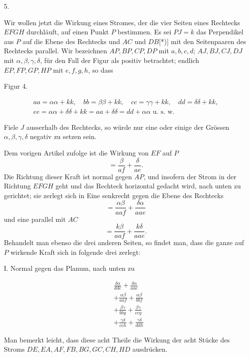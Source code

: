 \clearpage\begingroup
{}

\begin{center}5.\end{center}
\noindent\hspace*{\parindent}Wir wollen jetzt die Wirkung eines Stromes, der die vier Seiten eines Rechtecks $EFGH$ durchläuft, auf einen Punkt $P$ bestimmen. Es sei $PJ=k$ das Perpendikel aus $P$ auf die Ebene des Rechtecks und $AC$ und $DB$[*)] mit den Seitenpaaren des Rechtecks parallel. Wir bezeichnen $AP,BP,CP,DP$ mit $a,b,c,d$; $AJ,BJ,CJ,DJ$ mit $\alpha,\beta,\gamma,\delta$, für den Fall der Figur als positiv betrachtet; endlich $EP,FP,GP,HP$ mit $e,f,g,h$, so dass
\begin{center}\AbsoluteMaasseFigureFour\par\small Figur 4.\end{center}
\[
\begin{gathered}
aa=\alpha\alpha+kk,\quad bb=\beta\beta+kk,\quad cc=\gamma\gamma+kk,\quad dd=\delta\delta+kk,\\
ee=\alpha\alpha+\delta\delta+kk=aa+\delta\delta=dd+\alpha\alpha\text{ u. s. w.}
\end{gathered}
\]

\clearpage{}
Fiele $J$ ausserhalb des Rechtecks, so würde nur eine oder einige der Grössen $\alpha,\beta,\gamma,\delta$ negativ zu setzen sein.

Dem vorigen Artikel zufolge ist die Wirkung von $EF$ auf $P$
\[
=\frac{\beta}{af}+\frac{\delta}{ae}.
\]
\noindent Die Richtung dieser Kraft ist normal gegen $AP$, und insofern der Strom in der Richtung $EFGH$ geht und das Rechteck horizontal gedacht wird, nach unten zu gerichtet; sie zerlegt sich in Eine senkrecht gegen die Ebene des Rechtecks
\[
=\frac{\alpha\beta}{aaf}+\frac{\delta\alpha}{aae}
\]
\noindent und eine parallel mit $AC$
\[
=\frac{k\beta}{aaf}+\frac{k\delta}{aae}.
\]
\noindent Behandelt man ebenso die drei anderen Seiten, so findet man, dass die ganze auf $P$ wirkende Kraft sich in folgende drei zerlegt:

I. Normal gegen das Planum, nach unten zu
\par\medskip\noindent
\begin{minipage}[c]{.57\linewidth}
\[
\begin{aligned}
&\frac{\delta\alpha}{dde}+\frac{\delta\alpha}{aae}\\[4pt]
&+\frac{\alpha\beta}{aaf}+\frac{\alpha\beta}{bbf}\\[4pt]
&+\frac{\beta\gamma}{bbg}+\frac{\beta\gamma}{ccg}\\[4pt]
&+\frac{\gamma\delta}{cch}+\frac{\gamma\delta}{ddh}
\end{aligned}
\]
\end{minipage}\hfill
\begin{minipage}[c]{.39\linewidth}
Man bemerkt leicht, dass diese acht Theile die Wirkung der acht Stücke des Stroms $DE,\allowbreak EA,\allowbreak AF,\allowbreak FB,\allowbreak BG,\allowbreak GC,\allowbreak CH,\allowbreak HD$ ausdrücken.
\end{minipage}\par\medskip

